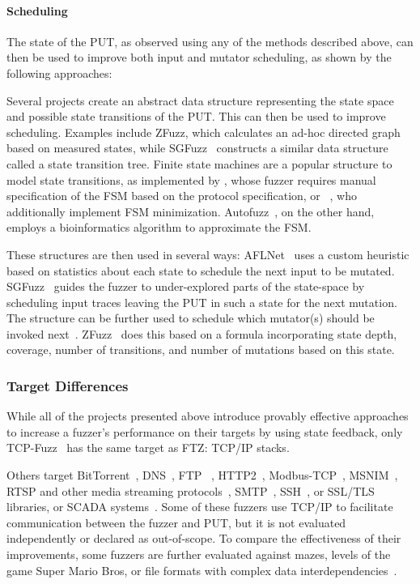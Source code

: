 \documentclass[twocolumn]{article}
\newcommand{\proj}{FTZ\xspace}
\let\savedCite=\cite
\renewcommand{\cite}{\unskip~\savedCite}
\begin{document}
\paragraph{Scheduling}

The state of the PUT, as observed using any of the methods described above, can then be used to improve both input and mutator scheduling, as shown by the following approaches:

Several projects create an abstract data structure representing the state space and possible state transitions of the PUT. This can then be used to improve scheduling. Examples include ZFuzz, which calculates an ad-hoc directed graph based on measured states, while SGFuzz\cite{SGFuzz} constructs a similar data structure called a state transition tree. Finite state machines are a popular structure to model state transitions, as implemented by \citeauthor{Congestion}, whose fuzzer requires manual specification of the FSM based on the protocol specification, or \citeauthor{ModelBased}\cite{ModelBased}, who additionally implement FSM minimization. Autofuzz\cite{Autofuzz}, on the other hand, employs a bioinformatics algorithm to approximate the FSM.

These structures are then used in several ways: AFLNet\cite{AFLNET} uses a custom heuristic based on statistics about each state to schedule the next input to be mutated. SGFuzz\cite{SGFuzz} guides the fuzzer to under-explored parts of the state-space by scheduling input traces leaving the PUT in such a state for the next mutation. The structure can be further used to schedule which mutator(s) should be invoked next\cite{ModelBased}. ZFuzz\cite{ZFuzz} does this based on a formula incorporating state depth, coverage, number of transitions, and number of mutations based on this state.

\subsubsection{Target Differences}
\label{RelatedWorks:ProtocolFuzzing:TargetDifferences}

While all of the projects presented above introduce provably effective approaches to increase a fuzzer's performance on their targets by using state feedback, only TCP-Fuzz\cite{TCPFuzz} has the same target as \proj: TCP/IP stacks.

Others target BitTorrent\cite{Ankou}, DNS\cite{StateAFL}, FTP \cite{AFLNET, FitM, StateAFL, Autofuzz,ZFuzz}, HTTP2\cite{SGFuzz}, Modbus-TCP\cite{ModbusTCP,ModbusTCP2, GANFuzz, MTA, MTFStorm, AnotherModbusTCP}, MSNIM\cite{ModelBased}, RTSP and other media streaming protocols\cite{AFLNET, SGFuzz}, SMTP\cite{StateAFL}, SSH\cite{StateAFL}, or SSL/TLS\cite{SGFuzz,ZFuzz,DDFuzz} libraries, or SCADA systems\cite{EPF}. Some of these fuzzers use TCP/IP to facilitate communication between the fuzzer and PUT, but it is not evaluated independently or declared as out-of-scope. To compare the effectiveness of their improvements, some fuzzers are further evaluated against mazes, levels of the game Super Mario Bros, or file formats with complex data interdependencies\cite {Ijon, SandPuppy, DDFuzz, Ankou}.
\end{document}
